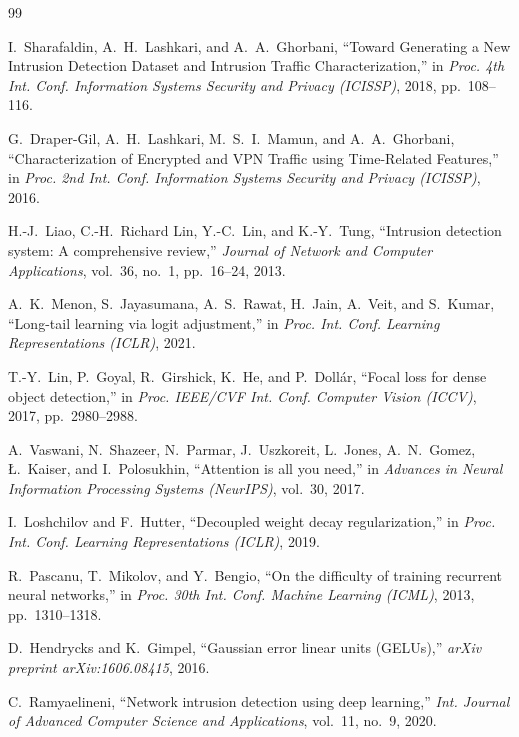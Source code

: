 \documentclass[12pt]{article}
\theoremstyle{plain}
\begin{document}
\newpage

\begin{thebibliography}{99}

I.~Sharafaldin, A.~H.~Lashkari, and A.~A.~Ghorbani,
``Toward Generating a New Intrusion Detection Dataset and Intrusion Traffic Characterization,''
in \textit{Proc. 4th Int. Conf. Information Systems Security and Privacy (ICISSP)}, 2018, pp.~108--116.

G.~Draper-Gil, A.~H.~Lashkari, M.~S.~I.~Mamun, and A.~A.~Ghorbani,
``Characterization of Encrypted and VPN Traffic using Time-Related Features,''
in \textit{Proc. 2nd Int. Conf. Information Systems Security and Privacy (ICISSP)}, 2016.

H.-J.~Liao, C.-H.~Richard Lin, Y.-C.~Lin, and K.-Y.~Tung,
``Intrusion detection system: A comprehensive review,''
\textit{Journal of Network and Computer Applications}, vol.~36, no.~1, pp.~16--24, 2013.

A.~K.~Menon, S.~Jayasumana, A.~S.~Rawat, H.~Jain, A.~Veit, and S.~Kumar,
``Long-tail learning via logit adjustment,''
in \textit{Proc. Int. Conf. Learning Representations (ICLR)}, 2021.

T.-Y.~Lin, P.~Goyal, R.~Girshick, K.~He, and P.~Dollár,
``Focal loss for dense object detection,''
in \textit{Proc. IEEE/CVF Int. Conf. Computer Vision (ICCV)}, 2017, pp.~2980--2988.

A.~Vaswani, N.~Shazeer, N.~Parmar, J.~Uszkoreit, L.~Jones, A.~N.~Gomez, Ł.~Kaiser, and I.~Polosukhin,
``Attention is all you need,''
in \textit{Advances in Neural Information Processing Systems (NeurIPS)}, vol.~30, 2017.

I.~Loshchilov and F.~Hutter,
``Decoupled weight decay regularization,''
in \textit{Proc. Int. Conf. Learning Representations (ICLR)}, 2019.

R.~Pascanu, T.~Mikolov, and Y.~Bengio,
``On the difficulty of training recurrent neural networks,''
in \textit{Proc. 30th Int. Conf. Machine Learning (ICML)}, 2013, pp.~1310--1318.

D.~Hendrycks and K.~Gimpel,
``Gaussian error linear units (GELUs),''
\textit{arXiv preprint arXiv:1606.08415}, 2016.

C.~Ramyaelineni,
``Network intrusion detection using deep learning,''
\textit{Int. Journal of Advanced Computer Science and Applications}, vol.~11, no.~9, 2020.


\end{thebibliography}
\end{document}
